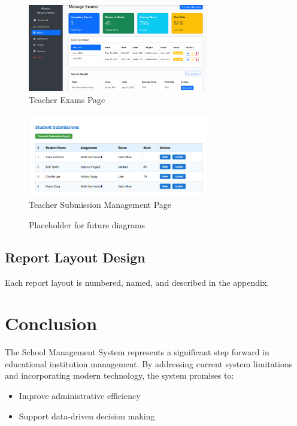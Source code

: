 \documentclass[12pt,a4paper]{report}
\begin{document}
\begin{figure}[htbp]
    \centering
    \includegraphics[width=0.7\textwidth]{teacher-exams-page.png}
    \caption{Teacher Exams Page}
    \label{fig:teacher-exams-page}
\end{figure}

\begin{figure}[htbp]
    \centering
    \includegraphics[width=0.7\textwidth]{teacher-submission-management-page.png}
    \caption{Teacher Submission Management Page}
    \label{fig:teacher-submission-management-page}
\end{figure}

\begin{figure}[htbp]
    \centering
    \caption{Placeholder for future diagrams}
\end{figure}

\section{Report Layout Design}
Each report layout is numbered, named, and described in the appendix.

\chapter{Conclusion}
The School Management System represents a significant step forward in educational institution management. By addressing current system limitations and incorporating modern technology, the system promises to:
\begin{itemize}
    \item Improve administrative efficiency
    \item Support data-driven decision making
\end{itemize}
\end{document}
